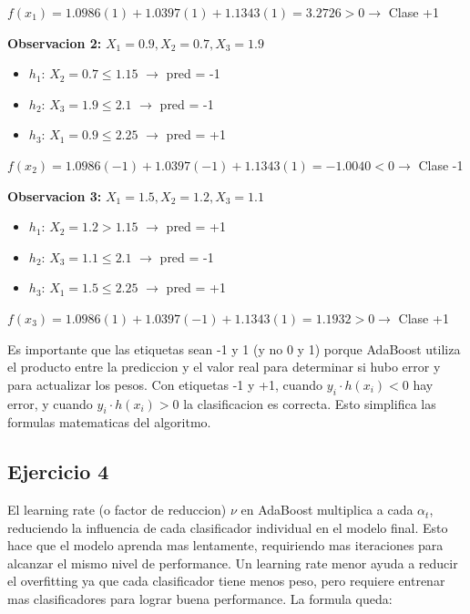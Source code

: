 \documentclass[12pt]{article}
\begin{document}
$f(x_1) = 1.0986(1) + 1.0397(1) + 1.1343(1) = 3.2726 > 0 \rightarrow$ Clase +1

\vspace{1em}

\textbf{Observacion 2: } $X_1 = 0.9, X_2 = 0.7, X_3 = 1.9$

\begin{itemize}
    \item $h_1$: $X_2 = 0.7 \leq 1.15$ $\rightarrow$ pred = -1
    \item $h_2$: $X_3 = 1.9 \leq 2.1$ $\rightarrow$ pred = -1
    \item $h_3$: $X_1 = 0.9 \leq 2.25$ $\rightarrow$ pred = +1
\end{itemize}

$f(x_2) = 1.0986(-1) + 1.0397(-1) + 1.1343(1) = -1.0040 < 0 \rightarrow$ Clase -1

\vspace{1em}

\textbf{Observacion 3: } $X_1 = 1.5, X_2 = 1.2, X_3 = 1.1$

\begin{itemize}
    \item $h_1$: $X_2 = 1.2 > 1.15$ $\rightarrow$ pred = +1
    \item $h_2$: $X_3 = 1.1 \leq 2.1$ $\rightarrow$ pred = -1
    \item $h_3$: $X_1 = 1.5 \leq 2.25$ $\rightarrow$ pred = +1
\end{itemize}

$f(x_3) = 1.0986(1) + 1.0397(-1) + 1.1343(1) = 1.1932 > 0 \rightarrow$ Clase +1

\vspace{1em}

Es importante que las etiquetas sean -1 y 1 (y no 0 y 1) porque AdaBoost utiliza el producto entre la prediccion y el valor real para determinar si hubo error y para actualizar los pesos. Con etiquetas -1 y +1, cuando $y_i \cdot h(x_i) < 0$ hay error, y cuando $y_i \cdot h(x_i) > 0$ la clasificacion es correcta. Esto simplifica las formulas matematicas del algoritmo.

\subsection{Ejercicio 4}

El learning rate (o factor de reduccion) $\nu$ en AdaBoost multiplica a cada $\alpha_t$, reduciendo la influencia de cada clasificador individual en el modelo final. Esto hace que el modelo aprenda mas lentamente, requiriendo mas iteraciones para alcanzar el mismo nivel de performance. Un learning rate menor ayuda a reducir el overfitting ya que cada clasificador tiene menos peso, pero requiere entrenar mas clasificadores para lograr buena performance. La formula queda: 
\end{document}
